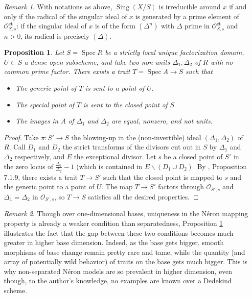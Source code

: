 \documentclass[a4paper,10pt,twoside]{article}
\newcommand{\ra}{\rightarrow}
\newcommand{\on}[1]{\operatorname{#1}}
\renewcommand{\O}{\mathcal{O}}
\DeclareMathOperator{\spec}{Spec}
\DeclareMathOperator{\sing}{Sing}
\newtheorem{prop}[thm]{Proposition}
\theoremstyle{definition}
\theoremstyle{remark}
\newtheorem{rem}{Remark}[thm]
\renewcommand{\on}[1]{\operatorname{#1}}
\begin{document}
\begin{rem}\label{remark:sing_irr_around_x_iff_label_is_a_prime_power}
With notations as above, $\sing(X/S)$ is irreducible around $x$ if and only if the radical of the singular ideal of $x$ is generated by a prime element of $\O_{S,s}^{\on{et}}$: if the singular ideal of $x$ is of the form $(\Delta^n)$ with $\Delta$ prime in $\O_{S,s}^{\on{et}}$ and $n>0$, its radical is precisely $(\Delta)$.
\end{rem}


\begin{prop}\label{proposition existence du trait qui rend egaux 2 elements premiers entre eux}
	Let $S=\spec R$ be a strictly local unique factorization domain, $U\subset S$ a dense open subscheme, and take two non-units $\Delta_1,\Delta_2$ of $R$ with no common prime factor. There exists a trait $T=\spec A\ra S$ such that
	\begin{itemize}
	\item The generic point of $T$ is sent to a point of $U$.
	\item The special point of $T$ is sent to the closed point of $S$
	\item The images in $A$ of $\Delta_1$ and $\Delta_2$ are equal, nonzero, and not units.
	\end{itemize}
\end{prop}


\begin{proof}
Take $\pi:S'\ra S$ the blowing-up in the (non-invertible) ideal $(\Delta_1,\Delta_2)$ of $R$. Call $D_1$ and $D_2$ the strict transforms of the divisors cut out in $S$ by $\Delta_1$ and $\Delta_2$ respectively, and $E$ the exceptional divisor. Let $s$ be a closed point of $S'$ in the zero locus of $\frac{\Delta_1}{\Delta_2}-1$ (which is contained in $E\backslash(D_1\cup D_2)$. By \cite{EGA2}, Proposition 7.1.9, there exists a trait $T\ra S'$ such that the closed point is mapped to $s$ and the generic point to a point of $U$. The map $T\ra S'$ factors through $\O_{S',s}$ and $\Delta_1=\Delta_2$ in $\O_{S',s}$, so $T\ra S$ satisfies all the desired properties.
\end{proof}


\begin{rem}
Though over one-dimensional bases, uniqueness in the N\'eron mapping property is already a weaker condition than separatedness, Proposition \ref{proposition existence du trait qui rend egaux 2 elements premiers entre eux} illustrates the fact that the gap between these two conditions becomes much greater in higher base dimension. Indeed, as the base gets bigger, smooth morphisms of base change remain pretty rare and tame, while the quantity (and array of potentially wild behavior) of traits on the base gets much bigger. This is why non-separated N\'eron models are so prevalent in higher dimension, even though, to the author's knowledge, no examples are known over a Dedekind scheme. 
\end{rem}
\end{document}
